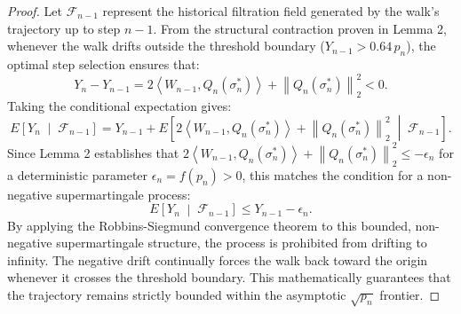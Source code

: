 \documentclass[11pt,a4paper]{article}
\newcommand{\norm}[1]{\left\lVert#1\right\rVert}
\newcommand{\inner}[2]{\left\langle #1, #2 \right\rangle}
\begin{document}
\begin{proof}
Let $\mathcal{F}_{n-1}$ represent the historical filtration field generated by the walk's trajectory up to step $n-1$. From the structural contraction proven in Lemma 2, whenever the walk drifts outside the threshold boundary ($Y_{n-1} > 0.64 \, p_n$), the optimal step selection ensures that:
\begin{equation}
    Y_n - Y_{n-1} = 2\inner{W_{n-1}}{Q_n(\sigma_n^*)} + \norm{Q_n(\sigma_n^*)}_2^2 < 0.
\end{equation}
Taking the conditional expectation gives:
\begin{equation}
    E\left[ Y_n \;\middle|\; \mathcal{F}_{n-1} \right] = Y_{n-1} + E\left[ 2\inner{W_{n-1}}{Q_n(\sigma_n^*)} + \norm{Q_n(\sigma_n^*)}_2^2 \;\middle|\; \mathcal{F}_{n-1} \right].
\end{equation}
Since Lemma 2 establishes that $2\inner{W_{n-1}}{Q_n(\sigma_n^*)} + \norm{Q_n(\sigma_n^*)}_2^2 \le -\epsilon_n$ for a deterministic parameter $\epsilon_n = f(p_n) > 0$, this matches the condition for a non-negative supermartingale process:
\begin{equation}
    E\left[ Y_n \;\middle|\; \mathcal{F}_{n-1} \right] \le Y_{n-1} - \epsilon_n.
\end{equation}
By applying the Robbins-Siegmund convergence theorem to this bounded, non-negative supermartingale structure, the process is prohibited from drifting to infinity. The negative drift continually forces the walk back toward the origin whenever it crosses the threshold boundary. This mathematically guarantees that the trajectory remains strictly bounded within the asymptotic $\sqrt{p_n}$ frontier.
\end{proof}
\end{document}
